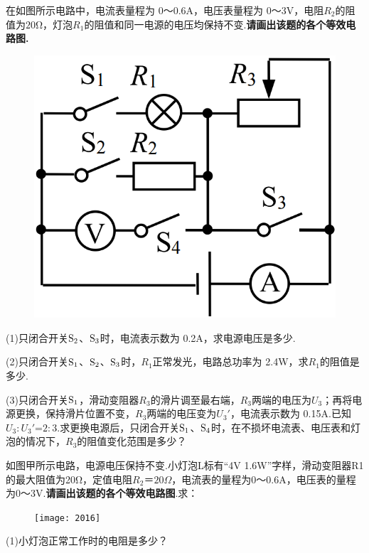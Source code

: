 \documentclass[11pt,a4paper]{article}
\newcommand{\nianfen}[1]{\hspace{-2em}{(#1\textbf{·}\textit{青岛})}}
\begin{document}
	
	\nianfen{2017}在如图所示电路中，电流表量程为 0～0.6A，电压表量程为 0～3V，电阻$R_2$的阻值为$20$Ω，灯泡$R_1$的阻值和同一电源的电压均保持不变.\textbf{请画出该题的各个等效电路图.}
	\begin{figure}
		\includegraphics[width=\linewidth]{2017.bmp}
	\end{figure}
	
	(1)只闭合开关$\rm S_2$、$\rm S_3$时，电流表示数为 0.2A，求电源电压是多少.
	
	(2)只闭合开关$\rm S_1$、$\rm S_2$、$\rm S_3$时，$R_1$正常发光，电路总功率为 2.4W，求$R_1$的阻值是多少.
	
	(3)只闭合开关$\rm S_1$，滑动变阻器$R_3$的滑片调至最右端，$R_3$两端的电压为$U_3$；再将电源更换，保持滑片位置不变，$R_3$两端的电压变为$U_3'$，电流表示数为 0.15A.已知$U_3:U_3'$=$2:3$.求更换电源后，只闭合开关$\rm S_1$、$\rm S_4$时，在不损坏电流表、电压表和灯泡的情况下，$R_3$的阻值变化范围是多少？
	\clearpage
	
	\nianfen{2016}如图甲所示电路，电源电压保持不变.小灯泡L标有“4V 1.6W”字样，滑动变阻器R1的最大阻值为20Ω，定值电阻$ R_2＝20Ω $，电流表的量程为0～0.6A，电压表的量程为0～3V.\textbf{请画出该题的各个等效电路图}.求：
	
	\begin{figure}
		\texttt{[image: 2016]}
	\end{figure}
	
	(1)小灯泡正常工作时的电阻是多少？
	
\end{document}
